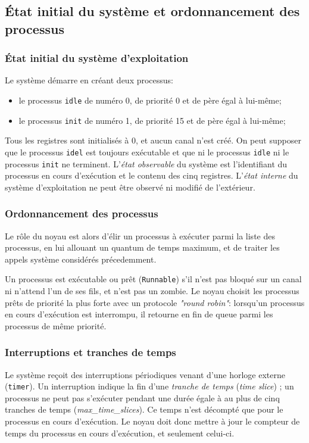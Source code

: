 \documentclass[french, toc]{../cs-classes/cs-classes}
\begin{document}
\subsection{État initial du système et ordonnancement des processus}
\subsubsection{État initial du système d'exploitation}
Le système démarre en créant deux processus:
\begin{itemize}
    \item le processus \texttt{idle} de numéro 0, de priorité 0 et de père égal à lui-même;
    \item le processus \texttt{init} de numéro 1, de priorité 15 et de père égal à lui-même;
\end{itemize}
Tous les registres sont initialisés à 0, et aucun canal n'est créé. On peut supposer que le processus \texttt{idel} est toujours exécutable et que ni le processus \texttt{idle} ni le processus \texttt{init} ne terminent. L'\emph{état observable} du système est l'identifiant du processus en cours d'exécution et le contenu des cinq registres. L'\emph{état interne} du système d'exploitation ne peut être observé ni modifié de l'extérieur. 

\subsubsection{Ordonnancement des processus}
Le rôle du noyau est alors d'élir un processus à exécuter parmi la liste des processus, en lui allouant un quantum de temps maximum, et de traiter les appels système considérés précedemment. 

Un processus est exécutable ou prêt (\texttt{Runnable}) s'il n'est pas bloqué sur un canal ni n'attend l'un de ses fils, et n'est pas un zombie. Le noyau choisit les processus prêts de priorité la plus forte avec un protocole \emph{"round robin"}: lorsqu'un processus en cours d'exécution est interrompu, il retourne en fin de queue parmi les processus de même priorité.

\subsubsection{Interruptions et tranches de temps}
Le système reçoit des interruptions périodiques venant d'une horloge externe (\texttt{timer}). Un interruption indique la fin d'une \emph{tranche de temps} (\emph{time slice}) ; un processus ne peut pas s'exécuter pendant une durée égale à au plus de cinq tranches de temps (\emph{max\_time\_slices}). Ce temps n'est décompté que pour le processus en cours d'exécution. Le noyau doit donc mettre à jour le compteur de temps du processus en cours d'exécution, et seulement celui-ci.
\end{document}
